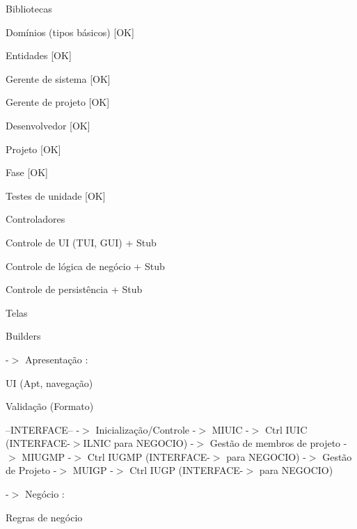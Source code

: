 
\begin{DoxyItemize}
\item Bibliotecas
\begin{DoxyItemize}
\item Domínios (tipos básicos) \mbox{[}OK\mbox{]}
\item Entidades \mbox{[}OK\mbox{]}
\begin{DoxyItemize}
\item Gerente de sistema \mbox{[}OK\mbox{]}
\item Gerente de projeto \mbox{[}OK\mbox{]}
\item Desenvolvedor \mbox{[}OK\mbox{]}
\item Projeto \mbox{[}OK\mbox{]}
\item Fase \mbox{[}OK\mbox{]}
\end{DoxyItemize}
\item Testes de unidade \mbox{[}OK\mbox{]}
\item Controladores
\begin{DoxyItemize}
\item Controle de UI (T\+UI, G\+UI) + Stub
\item Controle de lógica de negócio + Stub
\item Controle de persistência + Stub
\end{DoxyItemize}
\item Telas
\item Builders
\end{DoxyItemize}
\end{DoxyItemize}

-\/$>$ Apresentação \+:
\begin{DoxyItemize}
\item UI (Apt, navegação)
\item Validação (Formato)
\end{DoxyItemize}

--I\+N\+T\+E\+R\+F\+A\+CE-- -\/$>$ Inicialização/\+Controle -\/$>$ M\+I\+U\+IC -\/$>$ Ctrl I\+U\+IC (I\+N\+T\+E\+R\+F\+A\+C\+E-\/$>$I\+L\+N\+IC para N\+E\+G\+O\+C\+IO) -\/$>$ Gestão de membros de projeto -\/$>$ M\+I\+U\+G\+MP -\/$>$ Ctrl I\+U\+G\+MP (I\+N\+T\+E\+R\+F\+A\+C\+E-\/$>$ para N\+E\+G\+O\+C\+IO) -\/$>$ Gestão de Projeto -\/$>$ M\+U\+I\+GP -\/$>$ Ctrl I\+U\+GP (I\+N\+T\+E\+R\+F\+A\+C\+E-\/$>$ para N\+E\+G\+O\+C\+IO)

-\/$>$ Negócio \+:
\begin{DoxyItemize}
\item Regras de negócio
\end{DoxyItemize}

